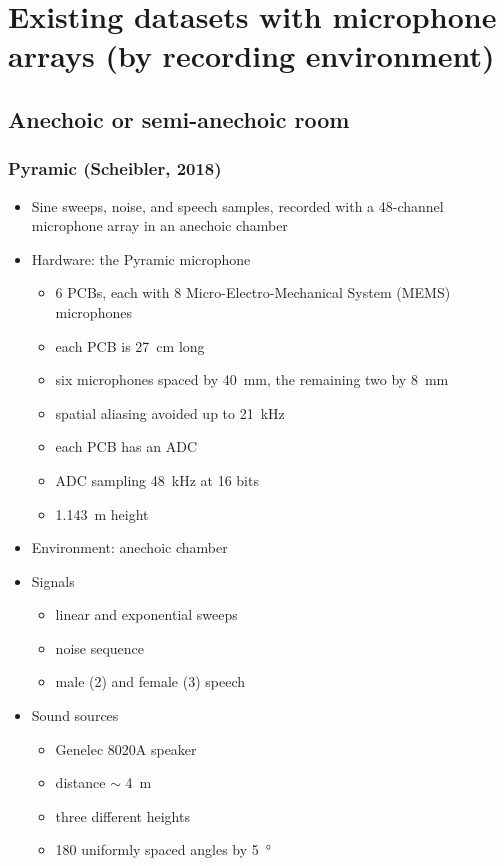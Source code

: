 \documentclass[14pt, legalpaper]{extarticle}
\begin{document}
\section{Existing datasets with microphone arrays (by recording environment)}

\subsection{Anechoic or semi-anechoic room}

\subsubsection{Pyramic (Scheibler, 2018)}

\begin{itemize}

\item Sine sweeps, noise, and speech samples, recorded with a 48-channel microphone array in an anechoic chamber \cite{scheibler2018pyramic}

\item Hardware: the Pyramic microphone \cite{scheibler2018pyramic}
	\begin{itemize}
	\item 6 PCBs, each with 8 Micro-Electro-Mechanical System (MEMS) microphones 
	\item each PCB is \SI{27}{\centi\metre} long
	\item six microphones spaced by \SI{40}{\milli\metre}, the remaining two by \SI{8}{\milli\metre}
	\item spatial aliasing avoided up to \SI{21}{\kilo\hertz}
	\item each PCB has an ADC
	\item ADC sampling \SI{48}{\kilo\hertz} at 16 bits
	\item \SI{1.143}{\metre} height
	\end{itemize}

\item Environment: anechoic chamber
	
\item Signals
	\begin{itemize}
	\item linear and exponential sweeps
	\item noise sequence
	\item male (2) and female (3) speech
	\end{itemize}

\item Sound sources
	\begin{itemize}
	\item Genelec 8020A speaker
	\item distance $\sim$ \SI{4}{\metre}
	\item three different heights
	\item 180 uniformly spaced angles by \SI{5}{\degree}
	\end{itemize}


\end{itemize}
\end{document}
